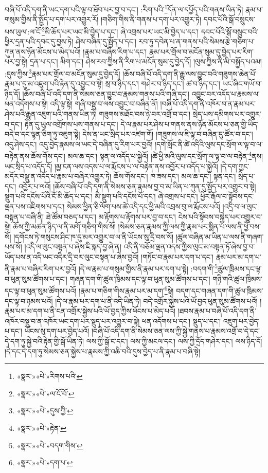 བཞི་པོ་འདི་དག་ནི་ཡང་དག་པའི་ལྟ་བ་ཐོབ་པར་བྱ་བ་དང་། :རིག་པའི་\footnote{«སྣར་»«པེ་»རིགས་པའི་}དོན་ལ་དཔྱོད་པའི་གནས་ཡིན་ཏེ། རྣམ་པ་གསུམ་གྱིས་ནི་སྤྱོད་པ་དག་པར་འགྱུར་རོ། །གཅིག་གིས་ནི་གནས་པ་དག་པར་འགྱུར་ཏེ། དབང་པོའི་སྒོ་བསྲུངས་པས་ཡུལ་:ལ་ངོ་\footnote{«སྣར་»«པེ་»ལ་ངོ་བོ་}མི་ཆོད་པར་ཡང་མི་བྱེད་པ་དང་། ཞེ་འགྲས་པར་ཡང་མི་བྱེད་པ་དང་། དབང་པོའི་སྒོ་བསྲུང་བའི་ཕྱིར་དྲན་པའི་དབང་དུ་བྱས་ཏེ། ཤེས་བཞིན་དུ་སྤྱོད་པ་དང་། རབ་ཏུ་དབེན་པ་ན་གནས་པའི་སེམས་རྩེ་གཅིག་པ་ཀུན་ནས་ཉོན་མོངས་པ་མེད་པའོ། །རྣམ་པ་བཞིས་རིག་པ་དང་། རྣམ་པར་གྲོལ་བ་མངོན་སུམ་དུ་བྱེད་པར་རིག་པར་བྱ་སྟེ། དྲན་པ་དང་། མིག་དང་། ཤེས་རབ་ཀྱིས་ནི་རིག་པ་མངོན་སུམ་དུ་བྱེད་དོ། །ལུས་ཀྱིས་ནི་མི་བསྐྱོད་པའམ། :དུས་ཀྱིས་\footnote{«སྣར་»«པེ་»དུས་ཀྱི་}རྣམ་པར་གྲོལ་བ་མངོན་སུམ་དུ་བྱེད་དོ། །ཆོས་བཞི་པོ་འདི་དག་ནི་རྒྱུ་ལས་བྱུང་བའི་གཟུགས་ཆེན་པོ་རྣམ་པ་དུ་མ་འཇུག་པའི་རྟེན་དུ་འབྱུང་བ་སྟེ། སྲ་བ་ཉིད་དང་། གཤེར་བ་ཉིད་དང་། ཚ་བ་ཉིད་དང་། ཡང་ཞིང་གཡོ་བ་ཉིད་དོ། །ཆོས་བཞི་པོ་འདི་དག་ནི་སེམས་ཅན་བྱུང་བ་རྣམས་གནས་པའི་གཞི་དང་། འབྱུང་བར་འདོད་པ་རྣམས་ལ་ཕན་འདོགས་པ་སྟེ། འདི་ལྟ་སྟེ། གཞི་བསྡུ་བ་ལས་འབྱུང་བ་བཞིན་ནོ། །བཞི་པོ་འདི་དག་ནི་འཁོར་བ་ན་རྣམ་པར་ཤེས་པའི་རྒྱུན་འཇུག་པའི་གནས་ཡིན་ཏེ། གཟུགས་མཐོང་བས་ཉེ་བར་འགྲོ་བ་དང་། སྲེད་པས་དམིགས་པར་འགྱུར་བ་དང་། རྟེན་དུ་ཡུལ་འགྲོགས་པས་གནས་པ་དང་། དེ་ལ་རྣམ་པར་ཤེས་པ་གནས་ནས་ཉོན་མོངས་པ་ཅན་གྱི་ཡིད་བདེ་བ་དང་ལྷན་ཅིག་ཏུ་འཇུག་སྟེ། དེས་ན་ཡང་སྲིད་པར་འཛག་གོ། །གཟུགས་ལ་ཇི་ལྟ་བ་བཞིན་དུ་ཚོར་བ་དང་། འདུ་ཤེས་དང་། འདུ་བྱེད་རྣམས་ལ་ཡང་དེ་བཞིན་དུ་རིག་པར་བྱའོ། །དགེ་སློང་ནི་ཚེ་འདིའི་ལུས་དང་སྲོག་ལ་ལྟ་བ་ལ་བརྟེན་ནས་ཆོས་གོས་དང་། མལ་ཆ་དང་། སྟན་ལ་འདོད་པ་སྐྱེའོ། །ཚེ་ཕྱི་མའི་ལུས་དང་སྲོག་ལ་ལྟ་བ་ལ་བརྟེན་\footnote{«སྣར་»«པེ་»རྟེན་}ནས། ཡང་སྲིད་པ་འདོད་དོ། །མྱ་ངན་ལས་འདས་པ་ལ་རྨོངས་པ་ལ་བརྟེན་ནས་འབྱོར་པ་འདོད་པ་སྐྱེའོ། །དེ་དག་ཀྱང་མདོར་བསྡུ་ན་འདོད་པ་རྣམ་པ་བཞིར་འགྱུར་ཏེ། ཆོས་གོས་དང་། ཁ་ཟས་དང་། མལ་ཆ་དང་། སྟན་དང་། སྲིད་པ་དང་། འབྱོར་པ་ལའོ། །ཆོས་བཞི་པོ་འདི་དག་ནི་སེམས་ཅན་རྣམས་བྱ་བ་མ་ཡིན་པ་ཀུན་དུ་སྤྱོད་པར་འགྱུར་བ་སྟེ། སྡུག་པའི་དངོས་པོའི་ངོ་མི་ཆོད་པ་དང་། མི་སྡུག་པའི་དངོས་པོ་དང་། ཞེ་འགྲས་པ་དང་། ཕྱིར་རྒོལ་བ་སྟོབས་དང་ལྡན་པས་འཇིགས་པ་དང་། སེམས་ཕྱིན་ཅི་ལོག་པས་ཚེ་འདི་དང་ཕྱི་མའི་འབྲས་བུ་ལ་རྨོངས་པའོ། །འདྲི་བ་ལ་ལུང་བསྟན་པ་བཞི་ནི། ཐེ་ཚོམ་བཅད་པ་དང་། མ་རྟོགས་པ་རྟོགས་པར་བྱ་བ་དང་། ངེས་པའི་སྟོབས་བསྐྱེད་པར་འགྱུར་བ་སྟེ། ཆོས་ཀྱི་མཚན་ཉིད་ལ་ནི་མགོ་གཅིག་གིས་སོ། །སེམས་ཅན་རྣམས་ཀྱི་ལས་ཀྱི་རྣམ་པར་སྨིན་པ་ལས་ནི་ཕྱེ་བས་སོ། །དགོངས་ཏེ་གསུངས་ཤིང་ཁ་དུ་མར་འགྱུར་བ་ལ་ནི་ཡོངས་སུ་དྲི་བས་སོ། །ཚུལ་བཞིན་མ་ཡིན་པ་ལས་ནི་གཞག་པས་སོ། །འདི་ལ་ལུང་བསྟན་པ་ཞེས་ཇི་སྐད་བྱ་ཞེ་ན། འདི་ནི་བཅོམ་ལྡན་འདས་ཀྱིས་ལུང་མ་བསྟན་ཏོ་ཞེས་བྱ་བ་ཡོད་པས་ན་འདི་ཡང་འདིར་དྲི་བར་ལུང་བསྟན་པ་ཞེས་བྱའོ། །གཏོང་བ་རྣམ་པར་དག་པ་དང་། རྣམ་པར་མ་དག་པ་ནི་རྣམ་པ་བཞིར་རིག་པར་བྱའོ། །དེ་ལ་རྣམ་པ་གསུམ་གྱིས་ནི་རྣམ་པར་དག་པ་སྟེ། :བདག་གི་\footnote{«སྣར་»«པེ་»བདག་གིས་}ཚུལ་ཁྲིམས་དང་ལྟ་བ་ཕུན་སུམ་ཚོགས་པ་དང་། གཞན་དག་གི་ཚུལ་ཁྲིམས་དང་ལྟ་བ་ཕུན་སུམ་ཚོགས་པ་དང་། གཉི་གའི་ཚུལ་ཁྲིམས་དང་ལྟ་བ་ཕུན་སུམ་ཚོགས་པའོ། །རྣམ་པ་གཅིག་གིས་རྣམ་པར་མ་དག་\footnote{«སྣར་»«པེ་»དག་པ་}སྟེ། བདག་དང་གཞན་དག་གི་ཚུལ་ཁྲིམས་དང་ལྟ་བ་ཉམས་པའོ། །དེ་ལ་རྣམ་པར་དག་པ་ནི་འདི་ཡིན་ཏེ། བདེ་འགྲོར་སྐྱེས་པའི་ཡོ་བྱད་ཕུན་སུམ་ཚོགས་པའོ། །རྣམ་པར་མ་དག་པ་ནི་ངན་འགྲོར་སྐྱེས་པའི་ཡོ་བྱད་ཀྱིས་ཕོངས་པ་མེད་པའོ། །ཐབས་རྣམ་པ་བཞི་པོ་འདི་དག་ནི་འཁོར་བསྡུ་བ་ན་འཁོར་ཡང་དག་པར་སྡུད་པར་འགྱུར་བ་སྟེ། ཕན་འདོགས་པ་དང་། སྡུད་པ་དང་། འཇུག་པར་བྱེད་པ་དང་། ཡོངས་སུ་དག་པར་བྱེད་པའོ། །བཞི་པོ་འདི་དག་ནི་སེམས་ཅན་ལས་ཀྱི་སྐྱེ་གནས་པ་རྣམས་འགྲོ་བ་དེ་དང་དེ་དག་ཏུ་སྐྱེ་བའི་རྟེན་གྱི་སྒོ་ཡིན་ཏེ། ལས་ཀྱི་སྒོ་ང་དང་། ལས་ཀྱི་མངལ་དང་། ལས་ཀྱི་དྲོད་གཤེར་དང་། ལས་ཉིད་དོ། །དེ་དང་དེ་དག་ཏུ་སེམས་ཅན་སྐྱེས་པ་རྣམས་ཀྱི་འཆི་བའི་དུས་བྱེད་པ་ནི་རྣམ་པ་བཞི་སྟེ། 